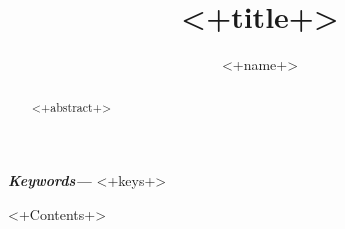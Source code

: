 \documentclass[]{article}
\title{<+title+>}
\author{<+name+>}
\providecommand{\keywords}[1]{\textbf{\textit{Keywords---}} #1}
\begin{document}
\maketitle
\begin{abstract}
  <+abstract+>
\end{abstract}
\keywords{<+keys+>}

\tableofcontents
\newpage

<+Contents+>
\end{document}
